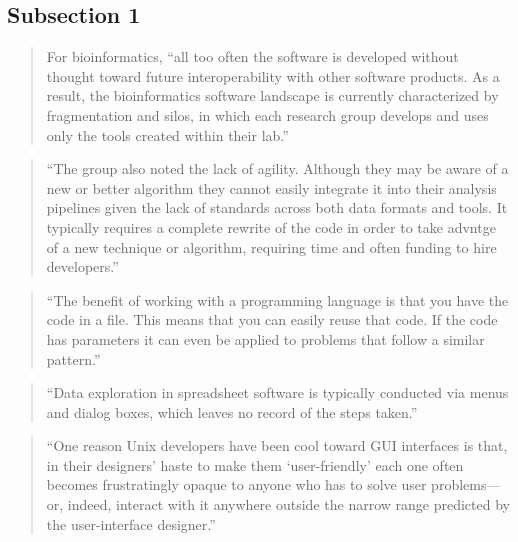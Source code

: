 \documentclass[]{tufte-book}
\begin{document}
\hypertarget{subsection-1-7}{%
\subsection{Subsection 1}\label{subsection-1-7}}

\begin{quote}
For bioinformatics, ``all too often the software is developed without
thought toward future interoperability with other software products. As a
result, the bioinformatics software landscape is currently characterized
by fragmentation and silos, in which each research group develops and uses
only the tools created within their lab.'' \citep{barga2011bioinformatics}
\end{quote}

\begin{quote}
``The group also noted the lack of agility. Although they may be aware of
a new or better algorithm they cannot easily integrate it into their
analysis pipelines given the lack of standards across both data formats
and tools. It typically requires a complete rewrite of the code in order
to take advntge of a new technique or algorithm, requiring time and often
funding to hire developers.'' \citep{barga2011bioinformatics}
\end{quote}

\begin{quote}
``The benefit of working with a programming language is that you have the code in
a file. This means that you can easily reuse that code. If the code has
parameters it can even be applied to problems that follow a similar pattern.''
\citep{janssens2014data}
\end{quote}

\begin{quote}
``Data exploration in spreadsheet software is typically conducted via menus and
dialog boxes, which leaves no record of the steps taken.'' \citep{murrell2009introduction}
\end{quote}

\begin{quote}
``One reason Unix developers have been cool toward GUI interfaces is that, in their
designers' haste to make them `user-friendly' each one often becomes frustratingly
opaque to anyone who has to solve user problems---or, indeed, interact with it anywhere
outside the narrow range predicted by the user-interface designer.'' \citep{raymond2003art}
\end{quote}
\end{document}
